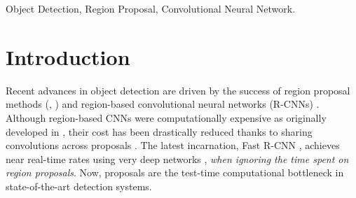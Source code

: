 \documentclass[10pt,journal,cspaper,compsoc]{IEEEtran}
\begin{document}
{%

\begin{keywords}
Object Detection, Region Proposal, Convolutional Neural Network.
\end{keywords}}


\maketitle



\IEEEpeerreviewmaketitle


\section{Introduction}

Recent advances in object detection are driven by the success of region proposal methods (\eg, \cite{Uijlings2013}) and region-based convolutional neural networks (R-CNNs) \cite{Girshick2014}. Although region-based CNNs were computationally expensive as originally developed in \cite{Girshick2014}, their cost has been drastically reduced thanks to sharing convolutions across proposals \cite{He2014,Girshick2015a}. The latest incarnation, Fast R-CNN \cite{Girshick2015a}, achieves near real-time rates using very deep networks \cite{Simonyan2015}, \emph{when ignoring the time spent on region proposals}. Now, proposals are the test-time computational bottleneck in state-of-the-art detection systems.
\end{document}
